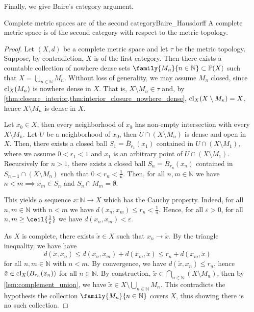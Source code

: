 Finally, we give Baire's category argument.
\begin{theorem}{Complete metric spaces are of the second category}{Baire_Hausdorff}
    A complete metric space is of the second category with respect to the metric topology.
\end{theorem}
\begin{proof}
    Let \((X, d)\) be a complete metric space and let \(\tau\) be the metric topology. Suppose, by contradiction, \(X\) is of the first category. Then there exists a countable collection of nowhere dense sets \(\family{M_n}{n \in \mathbb{N}} \subset \mathbb{P}(X)\) such that \(X = \bigcup_{n \in \mathbb{N}} M_n\). Without loss of generality, we may assume \(M_n\) closed, since \(\operatorname{cl}_X(M_n)\) is nowhere dense in \(X\). That is, \(X \setminus M_n \in \tau\) and, by \cref{thm:closure_interior,thm:interior_closure_nowhere_dense}, \(\operatorname{cl}_X(X \setminus M_n) = X\), hence \(X \setminus M_n\) is dense in \(X\).

    Let \(x_0 \in X\), then every neighborhood of \(x_0\) has non-empty intersection with every \(X\setminus M_n\). Let \(U\) be a neighborhood of \(x_0\), then \(U \cap (X\setminus M_n)\) is dense and open in \(X\). Then, there exists a closed ball \(S_1 = \bar{B}_{r_1}(x_1)\) contained in \(U \cap (X \setminus M_1)\), where we assume \(0 < r_1 < 1\) and \(x_1\) is an arbitrary point of \(U \cap (X \setminus M_1)\). Recursively for \(n > 1\), there exists a closed ball \(S_n = \bar{B}_{r_n}(x_n)\) contained in \(S_{n-1} \cap (X \setminus M_n)\) such that \(0 < r_n < \frac1n\). Then, for all \(n,m \in \mathbb{N}\) we have \(n < m \implies x_m \in S_n\) and \(S_n \cap M_m = \emptyset\).

    This yields a sequence \(x : \mathbb{N} \to X\) which has the Cauchy property. Indeed, for all \(n,m \in \mathbb{N}\) with \(n < m\) we have \(d(x_n, x_m) \leq r_n < \frac1n\). Hence, for all \(\varepsilon > 0\), for all \(n,m \geq \ceil{\frac{1}{\varepsilon}}\) we have \(d(x_n,x_m) < \varepsilon\).


    As \(X\) is complete, there exists \(\tilde{x} \in X\) such that \(x_n \to \tilde{x}\). By the triangle inequality, we have have
    \begin{equation*}
        d(\tilde{x}, x_n) \leq d(x_n, x_m) + d(x_m, \tilde{x}) \leq r_n + d(x_m, \tilde{x})
    \end{equation*}
    for all \(n,m \in \mathbb{N}\) with \(n < m\). By convergence, we have \(d(\tilde{x}, x_n) \leq r_n\), hence \(\tilde{x} \in \operatorname{cl}_X(B_{r_n}(x_n))\) for all \(n\in \mathbb{N}\). By construction, \(\tilde{x} \in \bigcap_{n\in \mathbb{N}} (X\setminus M_n)\), then by \cref{lem:complement_union}, we have \(\tilde{x} \in X \setminus \bigcup_{n\in \mathbb{N}} M_n\). This contradicts the hypothesis the collection \(\family{M_n}{n\in \mathbb{N}}\) covers \(X\), thus showing there is no such collection.
\end{proof}
